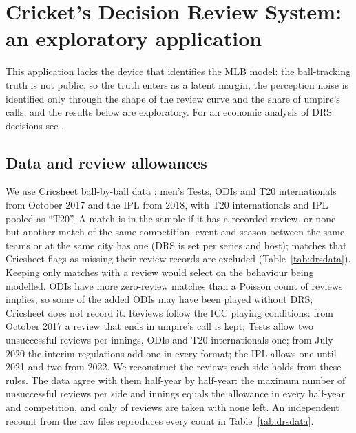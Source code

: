 \documentclass[aoas]{imsart}
\theoremstyle{plain}
\theoremstyle{definition}
\begin{document}
\begin{table}[!htbp]
\caption{Value of challenges in game win probability per team-game (challenges per team-game in parentheses), 95\%
game-bootstrap interval for the postseason.}\label{tab:postvalue}
\centering\small

\end{table}

\section{Cricket's Decision Review System: an exploratory application}\label{sec:drs}

This application lacks the device that identifies the MLB model: the ball-tracking truth is not public, so the truth
enters as a latent margin, the perception noise is identified only through the shape of the review curve and the
share of umpire's calls, and the results below are exploratory. For an economic analysis of DRS decisions see
\citet{Shivakumar2018}.

\subsection{Data and review allowances}
We use Cricsheet ball-by-ball data \citep{Cricsheet}: men's Tests, ODIs and T20 internationals from October 2017 and
the IPL from 2018, with T20 internationals and IPL pooled as ``T20''. A match is in the sample if it has a recorded
review, or none but another match of the same competition, event and season between the same teams or at the same
city has one (DRS is set per series and host); matches that Cricsheet flags as missing their review records are
excluded (Table~\ref{tab:drsdata}). Keeping only matches with a review would select on the behaviour being modelled.
ODIs have more zero-review matches than a Poisson count of reviews implies, so some of the added ODIs may have been
played without DRS; Cricsheet does not record it. Reviews follow the ICC playing conditions: from October 2017 a review that ends in umpire's
call is kept; Tests allow two unsuccessful reviews per innings, ODIs and T20 internationals one; from July 2020 the
interim regulations add one in every format; the IPL allows one until 2021 and two from 2022. We reconstruct the
reviews each side holds from these rules. The data agree with them half-year by half-year: the maximum number of
unsuccessful reviews per side and innings equals the allowance in every half-year and competition, and only
\SDRSNoneLeft{} of \SDRSReviews{} reviews are taken with none left. An independent recount from the raw files
reproduces every count in Table~\ref{tab:drsdata}.
\end{document}
